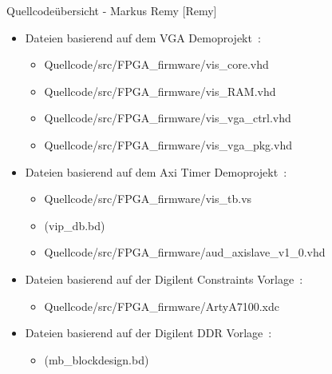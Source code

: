 \begin{frame}{Quellcodeübersicht - Markus Remy [Remy]}
    \begin{itemize}
        \item Dateien basierend auf dem VGA Demoprojekt~\cite{vga_demoprojekt}:
        \begin{itemize}
            \item Quellcode/src/FPGA\_firmware/vis\_core.vhd
            \item Quellcode/src/FPGA\_firmware/vis\_RAM.vhd
            \item Quellcode/src/FPGA\_firmware/vis\_vga\_ctrl.vhd
            \item Quellcode/src/FPGA\_firmware/vis\_vga\_pkg.vhd
        \end{itemize}
        \item Dateien basierend auf dem Axi Timer Demoprojekt~\cite{at_demoprojekt}:
        \begin{itemize}
            \item Quellcode/src/FPGA\_firmware/vis\_tb.vs
            \item (vip\_db.bd)
            \item Quellcode/src/FPGA\_firmware/aud\_axislave\_v1\_0.vhd
        \end{itemize}
        \item Dateien basierend auf der Digilent Constraints Vorlage~\cite{digilent_artya7_100_constraints}:
        \begin{itemize}
            \item Quellcode/src/FPGA\_firmware/ArtyA7100.xdc
        \end{itemize}
        \item Dateien basierend auf der Digilent DDR Vorlage~\cite{digilent_microblaze_ddr}:
        \begin{itemize}
            \item (mb\_blockdesign.bd)
        \end{itemize}
    \end{itemize}
\end{frame}
